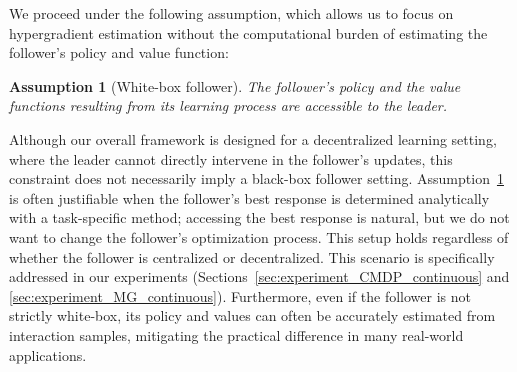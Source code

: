 \documentclass[letterpaper]{article} %
\newtheorem{assumption}{Assumption}
\begin{document}
We proceed under the following assumption, which allows us to focus on hypergradient estimation without the computational burden of estimating the follower’s policy and value function:
\begin{assumption}[White-box follower]\label{thm:assume_wb_follower}
    The follower’s policy and the value functions resulting from its learning process are accessible to the leader.
\end{assumption}
Although our overall framework is designed for a decentralized learning setting, where the leader cannot directly intervene in the follower's updates, this constraint does not necessarily imply a black-box follower setting. 
Assumption~\ref{thm:assume_wb_follower} is often justifiable when the follower's best response is determined analytically with a task-specific method; accessing the best response is natural, but we do not want to change the follower's optimization process. 
This setup holds regardless of whether the follower is centralized or decentralized. 
This scenario is specifically addressed in our experiments (Sections~\ref{sec:experiment_CMDP_continuous} and \ref{sec:experiment_MG_continuous}). 
Furthermore, even if the follower is not strictly white-box, its policy and values can often be accurately estimated from interaction samples, mitigating the practical difference in many real-world applications.
\end{document}
